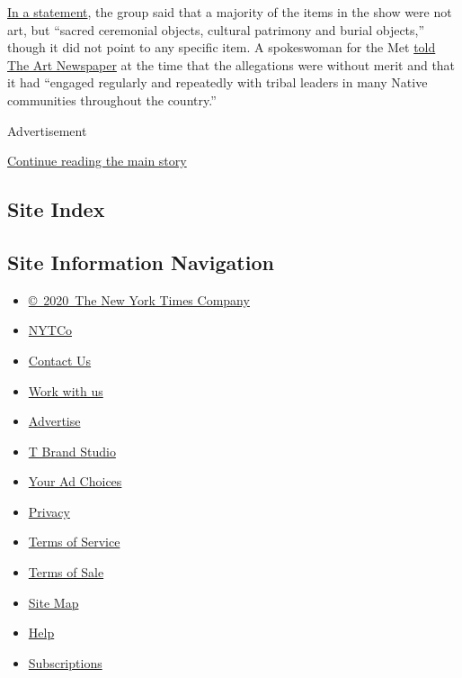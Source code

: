 \href{https://www.indian-affairs.org/uploads/8/7/3/8/87380358/2018-10-29_met_pr.pdf}{In
a statement}, the group said that a majority of the items in the show
were not art, but ``sacred ceremonial objects, cultural patrimony and
burial objects,'' though it did not point to any specific item. A
spokeswoman for the Met
\href{https://www.theartnewspaper.com/news/native-american-group-denounces-met-s-exhibition-of-indigenous-objects}{told
The Art Newspaper} at the time that the allegations were without merit
and that it had ``engaged regularly and repeatedly with tribal leaders
in many Native communities throughout the country.''

Advertisement

\protect\hyperlink{after-bottom}{Continue reading the main story}

\hypertarget{site-index}{%
\subsection{Site Index}\label{site-index}}

\hypertarget{site-information-navigation}{%
\subsection{Site Information
Navigation}\label{site-information-navigation}}

\begin{itemize}
\tightlist
\item
  \href{https://help.nytimes3xbfgragh.onion/hc/en-us/articles/115014792127-Copyright-notice}{©~2020~The
  New York Times Company}
\end{itemize}

\begin{itemize}
\tightlist
\item
  \href{https://www.nytco.com/}{NYTCo}
\item
  \href{https://help.nytimes3xbfgragh.onion/hc/en-us/articles/115015385887-Contact-Us}{Contact
  Us}
\item
  \href{https://www.nytco.com/careers/}{Work with us}
\item
  \href{https://nytmediakit.com/}{Advertise}
\item
  \href{http://www.tbrandstudio.com/}{T Brand Studio}
\item
  \href{https://www.nytimes3xbfgragh.onion/privacy/cookie-policy\#how-do-i-manage-trackers}{Your
  Ad Choices}
\item
  \href{https://www.nytimes3xbfgragh.onion/privacy}{Privacy}
\item
  \href{https://help.nytimes3xbfgragh.onion/hc/en-us/articles/115014893428-Terms-of-service}{Terms
  of Service}
\item
  \href{https://help.nytimes3xbfgragh.onion/hc/en-us/articles/115014893968-Terms-of-sale}{Terms
  of Sale}
\item
  \href{https://spiderbites.nytimes3xbfgragh.onion}{Site Map}
\item
  \href{https://help.nytimes3xbfgragh.onion/hc/en-us}{Help}
\item
  \href{https://www.nytimes3xbfgragh.onion/subscription?campaignId=37WXW}{Subscriptions}
\end{itemize}
